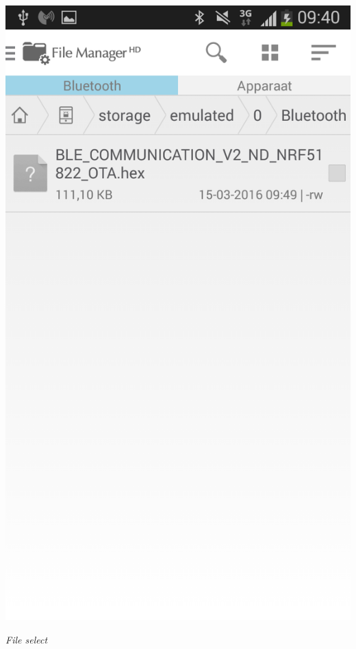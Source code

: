 \documentclass[conference]{IEEEtran}
\begin{document}
\begin{center}
    \includegraphics[scale=0.3]{FOTA7}
    \begin{minipage}{0.6\textwidth}
    \footnotesize
    \emph{File select}
    \end{minipage}
\end{center}
\end{document}
